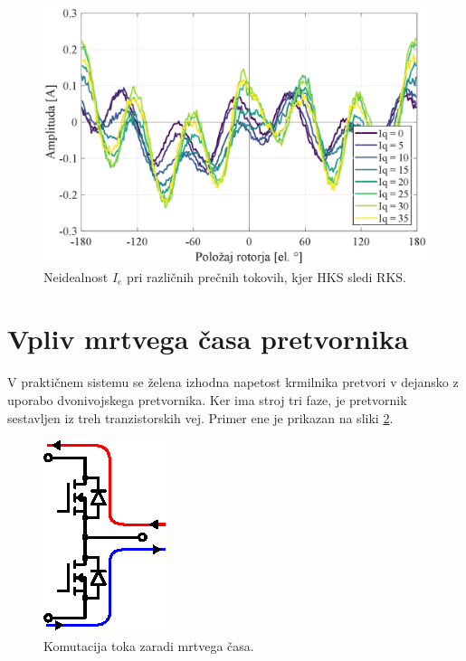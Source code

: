 \documentclass[a4paper,twoside,openright,12pt,slovene]{book}
\begin{document}
\begin{figure}[!htbp]
    \centering
    \includegraphics[width=0.99\columnwidth]{Slike/tokovniOdzivIs_HKSslediRKS_diff.eps}
    \caption{\label{tokovniOdzivIs_HKSslediRKS_diff} Neidealnost $I_e$ pri različnih prečnih tokovih, kjer HKS sledi RKS.}
\end{figure}
\newpage
\section{Vpliv mrtvega časa pretvornika}

V praktičnem sistemu se želena izhodna napetost krmilnika pretvori v dejansko z uporabo dvonivojskega pretvornika. Ker ima stroj tri faze, je pretvornik sestavljen iz treh tranzistorskih vej. Primer
ene je prikazan na sliki \ref{mrtviCasRazlaga}. 

\begin{figure}[!htbp]
    \centering
    \includegraphics[width=0.4\columnwidth]{Slike/Inkscape/mrtviCasRazlaga.eps}
    \caption{\label{mrtviCasRazlaga} Komutacija toka zaradi mrtvega časa.}
\end{figure}
\end{document}
